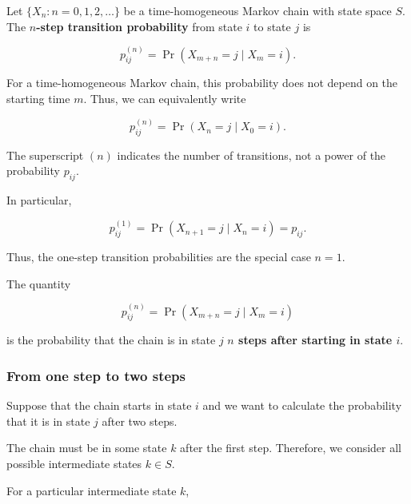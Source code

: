 \documentclass[
  letterpaper,
  DIV=11,
  numbers=noendperiod]{scrartcl}
\theoremstyle{definition}
\theoremstyle{remark}
\begin{document}
Let \(\{X_n:n=0,1,2,\ldots\}\) be a time-homogeneous Markov chain with
state space \(S\). The \textbf{\(n\)-step transition probability} from
state \(i\) to state \(j\) is

\[
p_{ij}^{(n)}
=
\Pr(X_{m+n}=j\mid X_m=i).
\]

For a time-homogeneous Markov chain, this probability does not depend on
the starting time \(m\). Thus, we can equivalently write

\[
p_{ij}^{(n)}
=
\Pr(X_n=j\mid X_0=i).
\]

The superscript \((n)\) indicates the number of transitions, not a power
of the probability \(p_{ij}\).

In particular,

\[
p_{ij}^{(1)}
=
\Pr(X_{n+1}=j\mid X_n=i)
=
p_{ij}.
\]

Thus, the one-step transition probabilities are the special case
\(n=1\).

\begin{tcolorbox}[enhanced jigsaw, arc=.35mm, bottomrule=.15mm, bottomtitle=1mm, breakable, colback=white, colbacktitle=quarto-callout-note-color!10!white, colframe=quarto-callout-note-color-frame, coltitle=black, left=2mm, leftrule=.75mm, opacityback=0, opacitybacktitle=0.6, rightrule=.15mm, title=\textcolor{quarto-callout-note-color}{\faInfo}\hspace{0.5em}{Interpreting \(n\)-step transition probabilities}, titlerule=0mm, toprule=.15mm, toptitle=1mm]

The quantity

\[
p_{ij}^{(n)}
=
\Pr(X_{m+n}=j\mid X_m=i)
\]

is the probability that the chain is in state \(j\) \textbf{\(n\) steps
after starting in state \(i\)}.

\end{tcolorbox}

\subsubsection{From one step to two
steps}\label{from-one-step-to-two-steps}

Suppose that the chain starts in state \(i\) and we want to calculate
the probability that it is in state \(j\) after two steps.

The chain must be in some state \(k\) after the first step. Therefore,
we consider all possible intermediate states \(k\in S\).

For a particular intermediate state \(k\),
\end{document}

